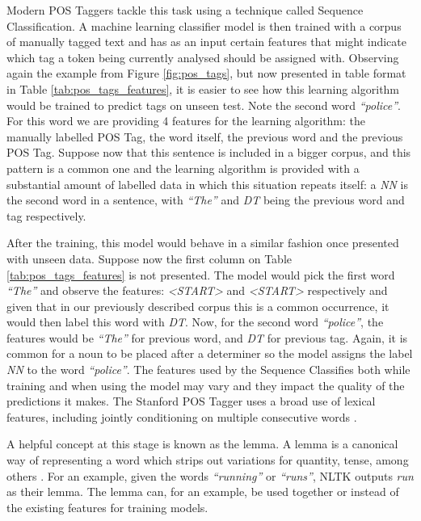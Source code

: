 \documentclass[11pt,a4paper,openright]{memoir}
\begin{document}
Modern POS Taggers tackle this task using a technique called Sequence Classification. A machine learning classifier model is then trained with a corpus of manually tagged text and has as an input certain features that might indicate which tag a token being currently analysed should be assigned with. Observing again the example from Figure \ref{fig:pos_tags}, but now presented in table format in Table \ref{tab:pos_tags_features}, it is easier to see how this learning algorithm would be trained to predict tags on unseen test. Note the second word \emph{\enquote{police}}. For this word we are providing 4 features for the learning algorithm: the manually labelled POS Tag, the word itself, the previous word and the previous POS Tag. Suppose now that this sentence is included in a bigger corpus, and this pattern is a common one and the learning algorithm is provided with a substantial amount of labelled data in which this situation repeats itself: a \emph{NN} is the second word in a sentence, with \emph{\enquote{The}} and \emph{DT} being the previous word and tag respectively.

After the training, this model would behave in a similar fashion once presented with unseen data. Suppose now the first column on Table \ref{tab:pos_tags_features} is not presented. The model would pick the first word \emph{\enquote{The}} and observe the features: \emph{<START>} and \emph{<START>} respectively and given that in our previously described corpus this is a common occurrence, it would then label this word with \emph{DT}. Now, for the second word \emph{\enquote{police}}, the features would be \emph{\enquote{The}} for previous word, and \emph{DT} for previous tag. Again, it is common for a noun to be placed after a determiner so the model assigns the label \emph{NN} to the word \emph{\enquote{police}}. The features used by the Sequence Classifies both while training and when using the model may vary and they impact the quality of the predictions it makes. The Stanford POS Tagger uses a broad use of lexical features, including jointly conditioning on multiple consecutive words \cite{Toutanova:2003:FPT:1073445.1073478}.

A helpful concept at this stage is known as the lemma. A lemma is a canonical way of representing a word which strips out variations for quantity, tense, among others \cite{Jurafsky:2000:SLP:555733}. For an example, given the words \emph{\enquote{running}} or \emph{\enquote{runs}}, NLTK \cite{BirdKleinLoper09} outputs \emph{run} as their lemma. The lemma can, for an example, be used together or instead of the existing features for training models.
\end{document}
